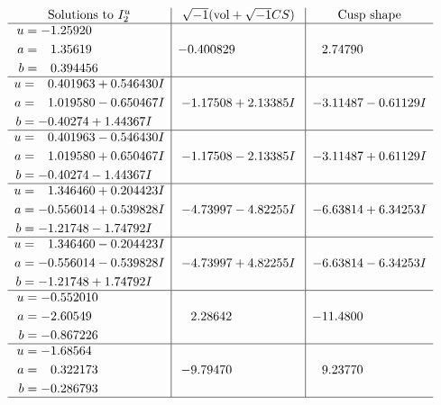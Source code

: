 \documentclass[1p]{elsarticle_modified}
\theoremstyle{definition}
\newcommand{\I}{\sqrt{-1}}
\begin{document}
$$\begin{array}{c|c|c}  
\text{Solutions to }I^u_{2}& \I (\text{vol} + \sqrt{-1}CS) & \text{Cusp shape}\\
 \hline 
\begin{aligned}
u &= -1.25920\phantom{ +0.000000I} \\
a &= \phantom{-}1.35619\phantom{ +0.000000I} \\
b &= \phantom{-}0.394456\phantom{ +0.000000I}\end{aligned}
 & -0.400829\phantom{ +0.000000I} & \phantom{-}2.74790\phantom{ +0.000000I} \\ \hline\begin{aligned}
u &= \phantom{-}0.401963 + 0.546430 I \\
a &= \phantom{-}1.019580 - 0.650467 I \\
b &= -0.40274 + 1.44367 I\end{aligned}
 & -1.17508 + 2.13385 I & -3.11487 - 0.61129 I \\ \hline\begin{aligned}
u &= \phantom{-}0.401963 - 0.546430 I \\
a &= \phantom{-}1.019580 + 0.650467 I \\
b &= -0.40274 - 1.44367 I\end{aligned}
 & -1.17508 - 2.13385 I & -3.11487 + 0.61129 I \\ \hline\begin{aligned}
u &= \phantom{-}1.346460 + 0.204423 I \\
a &= -0.556014 + 0.539828 I \\
b &= -1.21748 - 1.74792 I\end{aligned}
 & -4.73997 - 4.82255 I & -6.63814 + 6.34253 I \\ \hline\begin{aligned}
u &= \phantom{-}1.346460 - 0.204423 I \\
a &= -0.556014 - 0.539828 I \\
b &= -1.21748 + 1.74792 I\end{aligned}
 & -4.73997 + 4.82255 I & -6.63814 - 6.34253 I \\ \hline\begin{aligned}
u &= -0.552010\phantom{ +0.000000I} \\
a &= -2.60549\phantom{ +0.000000I} \\
b &= -0.867226\phantom{ +0.000000I}\end{aligned}
 & \phantom{-}2.28642\phantom{ +0.000000I} & -11.4800\phantom{ +0.000000I} \\ \hline\begin{aligned}
u &= -1.68564\phantom{ +0.000000I} \\
a &= \phantom{-}0.322173\phantom{ +0.000000I} \\
b &= -0.286793\phantom{ +0.000000I}\end{aligned}
 & -9.79470\phantom{ +0.000000I} & \phantom{-}9.23770\phantom{ +0.000000I}\\
 \hline 
 \end{array}$$\newpage\newpage\renewcommand{\arraystretch}{1}
\end{document}
